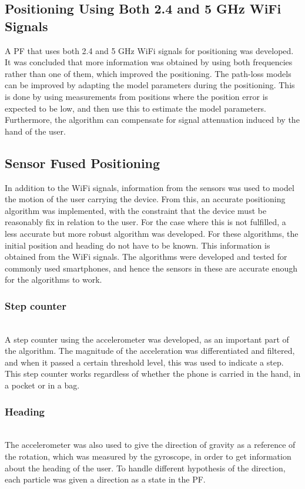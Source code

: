 \documentclass{LTHthesis}
\begin{document}
\subsection{Positioning Using Both 2.4 and 5 GHz WiFi Signals}
A PF that uses both 2.4 and 5 GHz WiFi signals for positioning was developed. It was concluded that more information was obtained by using both frequencies rather than one of them, which improved the positioning. The path-loss models can be improved by adapting the model parameters during the positioning. This is done by using measurements from positions where the position error is expected to be low, and then use this to estimate the model parameters. Furthermore, the algorithm can compensate for signal attenuation induced by the hand of the user.



\subsection{Sensor Fused Positioning}
In addition to the WiFi signals, information from the sensors was used to model the motion of the user carrying the device. From this, an accurate positioning algorithm was implemented, with the constraint that the device must be reasonably fix in relation to the user. For the case where this is not fulfilled, a less accurate but more robust algorithm was developed. For these algorithms, the initial position and heading do not have to be known. This information is obtained from the WiFi signals. The algorithms were developed and tested for commonly used smartphones, and hence the sensors in these are accurate enough for the algorithms to work.


\subsubsection{Step counter} ~\\
A step counter using the accelerometer was developed, as an important part of the algorithm. The magnitude of the acceleration was differentiated and filtered, and when it passed a certain threshold level, this was used to indicate a step. This step counter works regardless of whether the phone is carried in the hand, in a pocket or in a bag. 

\subsubsection{Heading} ~\\
The accelerometer was also used to give the direction of gravity as a reference of the rotation, which was measured by the gyroscope, in order to get information about the heading of the user. To handle different hypothesis of the direction, each particle was given a direction as a state in the PF.
\end{document}
